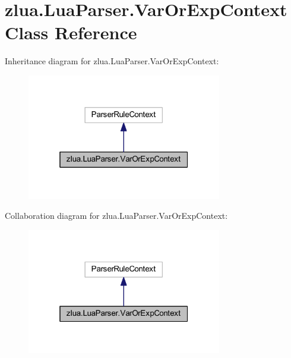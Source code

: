 \hypertarget{classzlua_1_1_lua_parser_1_1_var_or_exp_context}{}\section{zlua.\+Lua\+Parser.\+Var\+Or\+Exp\+Context Class Reference}
\label{classzlua_1_1_lua_parser_1_1_var_or_exp_context}


Inheritance diagram for zlua.\+Lua\+Parser.\+Var\+Or\+Exp\+Context\+:
\nopagebreak
\begin{figure}[H]
\begin{center}
\leavevmode
\includegraphics[width=241pt]{classzlua_1_1_lua_parser_1_1_var_or_exp_context__inherit__graph}
\end{center}
\end{figure}


Collaboration diagram for zlua.\+Lua\+Parser.\+Var\+Or\+Exp\+Context\+:
\nopagebreak
\begin{figure}[H]
\begin{center}
\leavevmode
\includegraphics[width=241pt]{classzlua_1_1_lua_parser_1_1_var_or_exp_context__coll__graph}
\end{center}
\end{figure}
